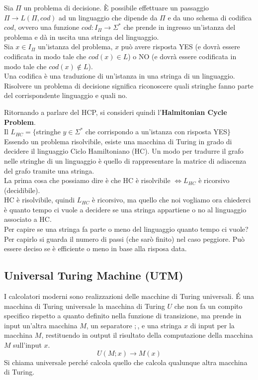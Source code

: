 {\medskip}

Sia $\Pi$ un problema di decisione. È possibile effettuare un passaggio $\Pi \to L(\Pi, cod)$ ad un linguaggio che dipende da $\Pi$ e da uno schema di codifica $cod$, ovvero una funzione $cod: I_{\Pi} \to \Sigma^*$ che prende in ingresso un’istanza del problema e dà in uscita una stringa del linguaggio.\\
Sia $x \in I_{\Pi}$ un’istanza del problema, $x$ può avere risposta YES (e dovrà essere codificata in modo tale che $cod(x) \in L$)  o NO (e dovrà essere codificata in modo tale che $cod(x) \notin L$). \\
Una codifica è una traduzione di un’istanza in una stringa di un linguaggio. Risolvere un problema di decisione significa riconoscere quali stringhe fanno parte del corrispondente linguaggio e quali no.

\medskip

Ritornando a parlare del HCP, si consideri quindi l’\textbf{Halmitonian Cycle Problem}.\\
Il $L_{HC} = \{$stringhe $y \in \Sigma^*$ che corrispondo a un’istanza con risposta YES$\}$ 
Essendo un problema risolvibile, esiste una macchina di Turing in grado di decidere il linguaggio Ciclo Hamiltoniano (HC). Un modo per tradurre il grafo nelle stringhe di un linguaggio è quello di rappresentare la matrice di adiacenza del grafo tramite una stringa. \\ La prima cosa che possiamo dire è che HC è risolvibile $\iff L_{HC}$ è ricorsivo (decidibile).\\
HC è risolvibile, quindi $L_{HC}$ è ricorsivo, ma quello che noi vogliamo ora chiederci è quanto tempo ci vuole a decidere se una stringa appartiene o no al linguaggio associato a HC.\\
Per capire se una stringa fa parte o meno del linguaggio quanto tempo ci vuole? Per capirlo si guarda il numero di passi (che sarò finito) nel caso peggiore. Può essere deciso se è efficiente o meno in base alla risposa data. 
\subsection{Universal Turing Machine (UTM)}
I calcolatori moderni sono realizzazioni delle macchine di Turing universali.
É una macchina di Turing universale la macchina di Turing $U$ che non fa un compito specifico rispetto a quanto definito nella funzione di transizione, ma prende in input un’altra macchina $M$, un separatore $;$, e una stringa $x$ di input per la macchina $M$, restituendo in output il risultato della computazione della macchina $M$ sull’input $x$.
$$U(M;x) \to M(x)$$
Si chiama universale perché calcola quello che calcola qualunque altra macchina di Turing. 

